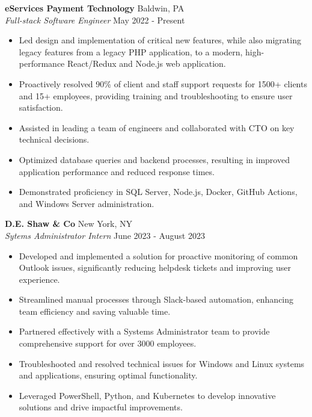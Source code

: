\documentclass[letterpaper]{article}
\begin{document}
\textbf{eServices Payment Technology} \hfill Baldwin, PA\\
\textit{Full-stack Software Engineer} \hfill May 2022 - Present\\
\vspace{-1mm}
\begin{itemize} \itemsep -1pt
    \item Led design and implementation of critical new features, while also migrating legacy features from a legacy PHP application, to a modern, high-performance React/Redux and Node.js web application.
    \item Proactively resolved 90\% of client and staff support requests for 1500+ clients and 15+ employees, providing training and troubleshooting to ensure user satisfaction.
    \item Assisted in leading a team of engineers and collaborated with CTO on key technical decisions.
    \item Optimized database queries and backend processes, resulting in improved application performance and reduced response times.
    \item Demonstrated proficiency in SQL Server, Node.js, Docker, GitHub Actions, and Windows Server administration.
\end{itemize}
\vspace{-1mm}
\textbf{D.E. Shaw \& Co} \hfill New York, NY\\
\textit{Sytems Administrator Intern} \hfill June 2023 - August 2023\\
\vspace{-1mm}
\begin{itemize} \itemsep -1pt
	\item Developed and implemented a solution for proactive monitoring of common Outlook issues, significantly reducing helpdesk tickets and improving user experience.
	\item Streamlined manual processes through Slack-based automation, enhancing team efficiency and saving valuable time.
	\item Partnered effectively with a Systems Administrator team to provide comprehensive support for over 3000 employees.
	\item Troubleshooted and resolved technical issues for Windows and Linux systems and applications, ensuring optimal functionality.
	\item Leveraged PowerShell, Python, and Kubernetes to develop innovative solutions and drive impactful improvements.
\end{itemize}
\end{document}
